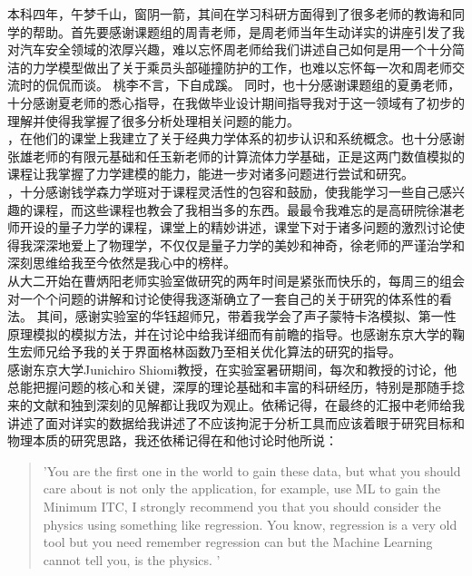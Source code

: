 \begin{acknowledgement}
  本科四年，午梦千山，窗阴一箭，其间在学习科研方面得到了很多老师的教诲和同学的帮助。首先要感谢课题组的周青老师，是周老师当年生动详实的讲座引发了我对汽车安全领域的浓厚兴趣，难以忘怀周老师给我们讲述自己如何是用一个十分简洁的力学模型做出了关于乘员头部碰撞防护的工作，也难以忘怀每一次和周老师交流时的侃侃而谈。 桃李不言，下自成蹊。 同时，也十分感谢课题组的夏勇老师，十分感谢夏老师的悉心指导，在我做毕业设计期间指导我对于这一领域有了初步的理解并使得我掌握了很多分析处理相关问题的能力。\\
  ，在他们的课堂上我建立了关于经典力学体系的初步认识和系统概念。也十分感谢张雄老师的有限元基础和任玉新老师的计算流体力学基础，正是这两门数值模拟的课程让我掌握了力学建模的能力，能进一步对诸多问题进行尝试和研究。\\
  ，十分感谢钱学森力学班对于课程灵活性的包容和鼓励，使我能学习一些自己感兴趣的课程，而这些课程也教会了我相当多的东西。最最令我难忘的是高研院徐湛老师开设的量子力学的课程，课堂上的精妙讲述，课堂下对于诸多问题的激烈讨论使得我深深地爱上了物理学，不仅仅是量子力学的美妙和神奇，徐老师的严谨治学和深刻思维给我至今依然是我心中的榜样。\\
  \indent 从大二开始在曹炳阳老师实验室做研究的两年时间是紧张而快乐的，每周三的组会对一个个问题的讲解和讨论使得我逐渐确立了一套自己的关于研究的体系性的看法。 其间，感谢实验室的华钰超师兄，带着我学会了声子蒙特卡洛模拟、第一性原理模拟的模拟方法，并在讨论中给我详细而有前瞻的指导。也感谢东京大学的鞠生宏师兄给予我的关于界面格林函数乃至相关优化算法的研究的指导。\\
  \indent 感谢东京大学Junichiro Shiomi教授，在实验室暑研期间，每次和教授的讨论，他总能把握问题的核心和关键，深厚的理论基础和丰富的科研经历，特别是那随手捻来的文献和独到深刻的见解都让我叹为观止。依稀记得，在最终的汇报中老师给我讲述了面对详实的数据给我讲述了不应该拘泥于分析工具而应该着眼于研究目标和物理本质的研究思路，我还依稀记得在和他讨论时他所说：
  \begin{quote}
   'You are the first one in the world to gain these data, but what you should care about is not only the application, for example, use ML to gain the Minimum ITC, I strongly recommend you that you should consider the physics using something like regression. You know, regression is a very old tool but you need remember regression can but the Machine Learning cannot tell you, is the physics. '

\end{quote}
\end{acknowledgement}
